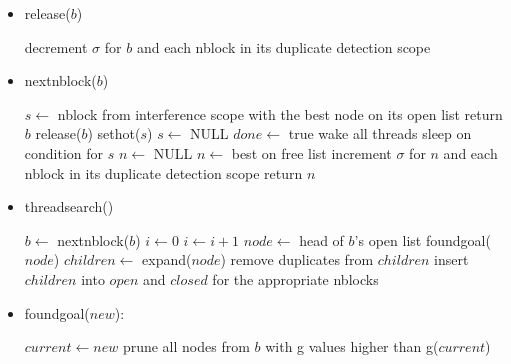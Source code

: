 \documentclass{article}
\begin{document}
\begin{itemize}
  \item release($b$)
  \begin{algorithmic}[1]
  \STATE decrement $\sigma$ for $b$ and each nblock in its duplicate detection scope
  \end{algorithmic}

  \item nextnblock($b$)
  \begin{algorithmic}[1]
    \STATE $s \leftarrow$ nblock from interference scope with the best node on its open list
      \STATE return $b$
    \ENDIF
    \STATE release($b$)
      \STATE sethot($s$)
    \ELSE
      \STATE $s \leftarrow$ NULL
    \ENDIF
  \ENDIF
    \STATE $done \leftarrow$ true
    \STATE wake all threads
  \ENDIF
    \STATE sleep on condition for $s$
  \ENDWHILE
    \STATE $n \leftarrow$ NULL
  \ELSE
    \STATE $n \leftarrow$ best on free list
    \STATE increment $\sigma$ for $n$ and each nblock in its duplicate detection scope
  \ENDIF
  \STATE return $n$
  \end{algorithmic}

  \item threadsearch()
  \begin{algorithmic}[1]
    \STATE $b \leftarrow$ nextnblock($b$)
      \STATE $i \leftarrow 0$
    \ENDIF
      \STATE $i \leftarrow i+1$
      \STATE $node \leftarrow$ head of $b$'s open list
        \STATE foundgoal($node$)
        \STATE $children \leftarrow$ expand($node$)
        \STATE remove duplicates from $children$
        \STATE insert $children$ into $open$ and $closed$ for the appropriate nblocks
      \ENDIF
    \ENDWHILE
  \ENDWHILE
  \end{algorithmic}

  \item foundgoal($new$):
  \begin{algorithmic}[1]
        \STATE $current \leftarrow new$
        \STATE prune all nodes from $b$ with g values higher than g($current$)
      \ENDIF
  \end{algorithmic}
\end{itemize}
\end{document}
